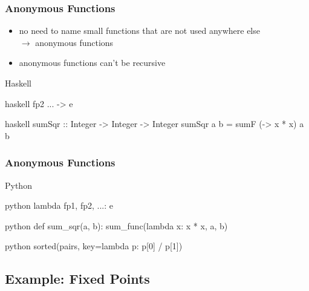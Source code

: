 \documentclass[dvipsnames]{beamer}
\theoremstyle{plain}
\begin{document}
\begin{frame}[fragile]
  \frametitle{Anonymous Functions}

  \begin{itemize}
    \item no need to name small functions that are not used anywhere else\\
      $\rightarrow$ \alert{anonymous functions}
    \item anonymous functions can't be recursive
  \end{itemize}

  \pause
  \begin{block}{Haskell}
    \begin{pygments}{haskell}
       fp2 ... -> e
    \end{pygments}
  \end{block}

  \medskip
  \begin{example}{}
    \begin{pygments}{haskell}
sumSqr :: Integer -> Integer -> Integer
sumSqr a b = sumF (\x -> x * x) a b
    \end{pygments}
  \end{example}
\end{frame}

\begin{frame}[fragile]
  \frametitle{Anonymous Functions}

  \begin{block}{Python}
    \begin{pygments}{python}
      lambda fp1, fp2, ...: e
    \end{pygments}
  \end{block}

  \medskip
  \begin{example}{}
    \begin{pygments}{python}
def sum_sqr(a, b):
    sum_func(lambda x: x * x, a, b)
    \end{pygments}

    \pause
    \bigskip
    \begin{pygments}{python}
sorted(pairs, key=lambda p: p[0] / p[1])
    \end{pygments}
  \end{example}
\end{frame}

\subsection{Example: Fixed Points}
\end{document}
